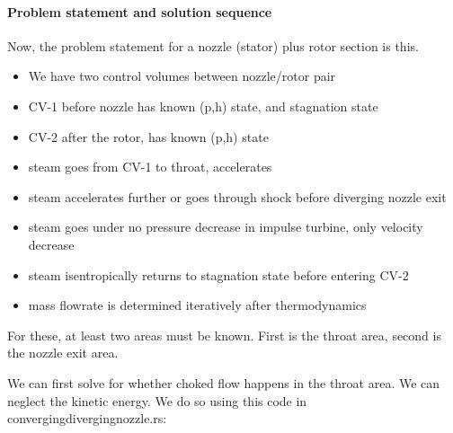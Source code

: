 \documentclass[masters]{ucbthesis}
\renewcommand{\_}{\kern-1.5pt\textunderscore\kern-1.5pt}
\begin{document}
\paragraph{Problem statement and solution sequence}
Now, the problem statement for a nozzle (stator) plus rotor section is 
this.

\begin{itemize}
	\item We have two control volumes between nozzle/rotor pair
	\item CV-1 before nozzle has known (p,h) state, and stagnation state 
	\item CV-2 after the rotor, has known (p,h) state
	\item steam goes from CV-1 to throat, accelerates 
	\item steam accelerates further or goes through shock before diverging nozzle exit 
	\item steam goes under no pressure decrease in impulse turbine, only velocity decrease 
	\item steam isentropically returns to stagnation state before entering CV-2
	\item mass flowrate is determined iteratively after thermodynamics
\end{itemize}

For these, at least two areas must be known.
First is the throat area, second is the nozzle exit area.

We can first solve for whether choked flow happens in the throat area.
We can neglect the kinetic energy. 
We do so using this code in converging\_diverging\_nozzle.rs:
\end{document}

